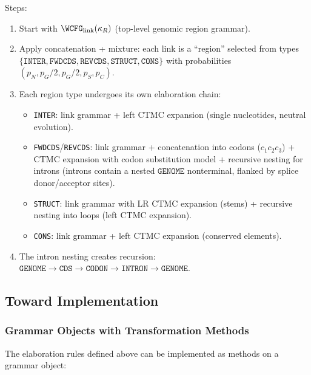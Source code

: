\noindent Steps:
\begin{enumerate}
\item Start with $\WCFG_{\mathrm{link}}(\kappa_R)$ (top-level genomic region grammar).
\item Apply concatenation + mixture: each link is a ``region''
  selected from types
  $\{\texttt{INTER}, \texttt{FWDCDS}, \texttt{REVCDS},
    \texttt{STRUCT}, \texttt{CONS}\}$
  with probabilities $(p_N, p_G/2, p_G/2, p_S, p_C)$.
\item Each region type undergoes its own elaboration chain:
  \begin{itemize}
  \item \texttt{INTER}: link grammar + left CTMC expansion
    (single nucleotides, neutral evolution).
  \item \texttt{FWDCDS}/\texttt{REVCDS}: link grammar + concatenation
    into codons ($c_1 c_2 c_3$) + CTMC expansion
    with codon substitution model + recursive nesting for introns
    (introns contain a nested $\texttt{GENOME}$ nonterminal,
    flanked by splice donor/acceptor sites).
  \item \texttt{STRUCT}: link grammar with LR CTMC expansion (stems)
    + recursive nesting into loops (left CTMC expansion).
  \item \texttt{CONS}: link grammar + left CTMC expansion
    (conserved elements).
  \end{itemize}
\item The intron nesting creates recursion:
  $\texttt{GENOME} \to \texttt{CDS} \to \texttt{CODON} \to
  \texttt{INTRON} \to \texttt{GENOME}$.
\end{enumerate}

\subsection{Toward Implementation}

\subsubsection{Grammar Objects with Transformation Methods}

The elaboration rules defined above can be implemented as methods
on a grammar object:

